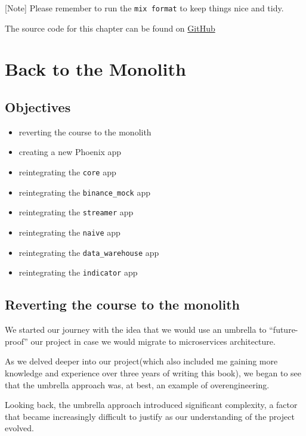 \documentclass[
  oneside]{book}
\providecommand{\tightlist}{%
  \setlength{\itemsep}{0pt}\setlength{\parskip}{0pt}}
\begin{document}
{[}Note{]} Please remember to run the \texttt{mix\ format} to keep things nice and tidy.

The source code for this chapter can be found on \href{https://github.com/Cinderella-Man/hands-on-elixir-and-otp-cryptocurrency-trading-bot-source-code/tree/chapter_22}{GitHub}

\chapter{Back to the Monolith}\label{back-to-the-monolith}

\section{Objectives}\label{objectives-22}

\begin{itemize}
\tightlist
\item
  reverting the course to the monolith
\item
  creating a new Phoenix app
\item
  reintegrating the \texttt{core} app
\item
  reintegrating the \texttt{binance\_mock} app
\item
  reintegrating the \texttt{streamer} app
\item
  reintegrating the \texttt{naive} app
\item
  reintegrating the \texttt{data\_warehouse} app
\item
  reintegrating the \texttt{indicator} app
\end{itemize}

\section{Reverting the course to the monolith}\label{reverting-the-course-to-the-monolith}

We started our journey with the idea that we would use an umbrella to ``future-proof'' our project in case we would migrate to microservices architecture.

As we delved deeper into our project(which also included me gaining more knowledge and experience over three years of writing this book), we began to see that the umbrella approach was, at best, an example of overengineering.

Looking back, the umbrella approach introduced significant complexity, a factor that became increasingly difficult to justify as our understanding of the project evolved.
\end{document}
